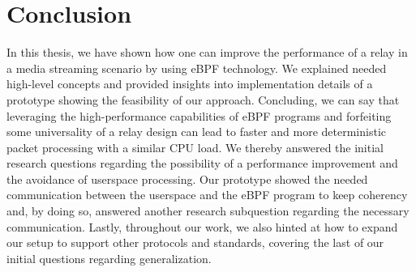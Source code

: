 \section{Conclusion}\label{sec:conclusion}
In this thesis, we have shown how one can improve the performance of a relay in a media streaming scenario 
by using eBPF technology.
We explained needed high-level concepts and provided insights into implementation details of a prototype 
showing the feasibility of our approach.
Concluding, we can say that leveraging the high-performance capabilities of eBPF programs and forfeiting 
some universality of a relay design can lead to faster and more deterministic packet processing with 
a similar CPU load.
We thereby answered the initial research questions regarding the possibility of a performance improvement 
and the avoidance of userspace processing.
Our prototype showed the needed communication between the userspace and the eBPF program to keep coherency and, by doing so, answered another research subquestion regarding the necessary communication.
Lastly, throughout our work, we also hinted at how to expand our setup to support other protocols and standards, 
covering the last of our initial questions regarding generalization.

